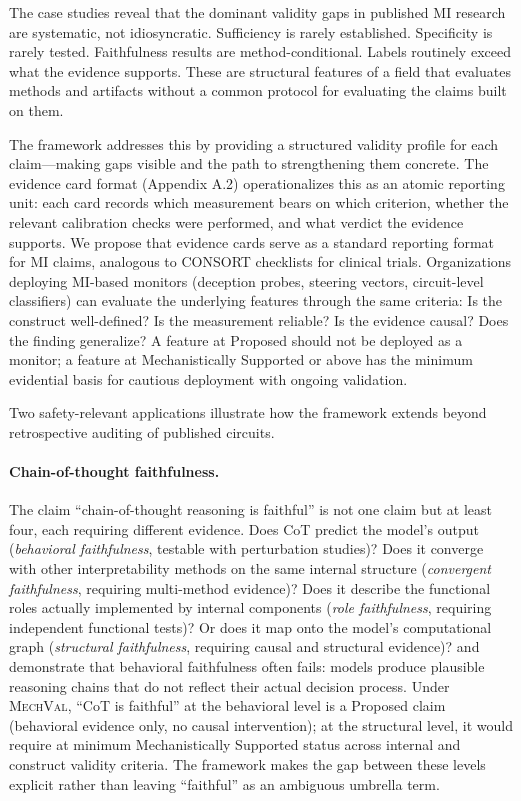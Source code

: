 \documentclass{article}
\newcommand{\mechval}{\textsc{MechVal}}
\begin{document}
The case studies reveal that the dominant validity gaps in published MI research are systematic, not idiosyncratic. Sufficiency is rarely established. Specificity is rarely tested. Faithfulness results are method-conditional. Labels routinely exceed what the evidence supports. These are structural features of a field that evaluates methods and artifacts without a common protocol for evaluating the claims built on them.

The framework addresses this by providing a structured validity profile for each claim---making gaps visible and the path to strengthening them concrete. The evidence card format (Appendix A.2) operationalizes this as an atomic reporting unit: each card records which measurement bears on which criterion, whether the relevant calibration checks were performed, and what verdict the evidence supports. We propose that evidence cards serve as a standard reporting format for MI claims, analogous to CONSORT checklists for clinical trials. Organizations deploying MI-based monitors (deception probes, steering vectors, circuit-level classifiers) can evaluate the underlying features through the same criteria: Is the construct well-defined? Is the measurement reliable? Is the evidence causal? Does the finding generalize? A feature at Proposed should not be deployed as a monitor; a feature at Mechanistically Supported or above has the minimum evidential basis for cautious deployment with ongoing validation.

Two safety-relevant applications illustrate how the framework extends beyond retrospective auditing of published circuits.

\paragraph{Chain-of-thought faithfulness.}
The claim ``chain-of-thought reasoning is faithful'' is not one claim but at least four, each requiring different evidence.  Does CoT predict the model's output (\emph{behavioral faithfulness}, testable with perturbation studies)?  Does it converge with other interpretability methods on the same internal structure (\emph{convergent faithfulness}, requiring multi-method evidence)?  Does it describe the functional roles actually implemented by internal components (\emph{role faithfulness}, requiring independent functional tests)?  Or does it map onto the model's computational graph (\emph{structural faithfulness}, requiring causal and structural evidence)?  \citet{lanham2023measuring} and \citet{turpin2024unfaithful} demonstrate that behavioral faithfulness often fails: models produce plausible reasoning chains that do not reflect their actual decision process.  Under \mechval{}, ``CoT is faithful'' at the behavioral level is a Proposed claim (behavioral evidence only, no causal intervention); at the structural level, it would require at minimum Mechanistically Supported status across internal and construct validity criteria.  The framework makes the gap between these levels explicit rather than leaving ``faithful'' as an ambiguous umbrella term.
\end{document}
